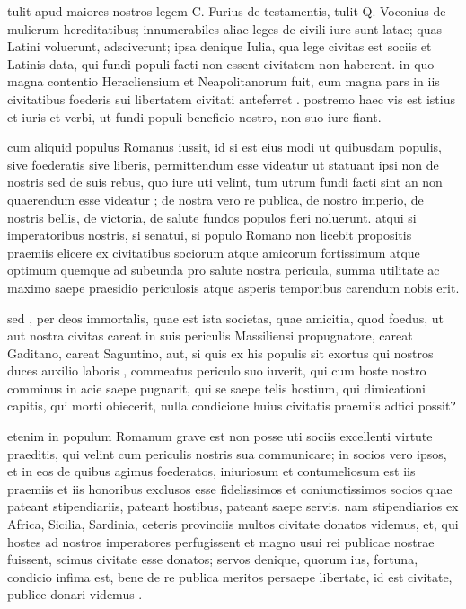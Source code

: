  tulit apud maiores nostros legem C. Furius de testamentis, tulit Q. Voconius de mulierum hereditatibus; innumerabiles aliae leges de civili iure sunt latae; quas Latini voluerunt, adsciverunt; ipsa denique Iulia, qua lege civitas est sociis et Latinis data, qui fundi populi facti non essent civitatem non haberent. in quo magna contentio Heracliensium et Neapolitanorum fuit, cum magna pars in iis civitatibus foederis sui libertatem civitati anteferret . postremo haec vis est istius et iuris et verbi, ut fundi populi beneficio nostro, non suo iure fiant.

 cum aliquid populus Romanus iussit, id si est eius modi ut quibusdam populis, sive foederatis sive liberis, permittendum esse videatur ut statuant ipsi non de nostris sed de suis rebus, quo iure uti velint, tum utrum fundi facti sint an non quaerendum esse videatur ; de nostra vero re publica, de nostro imperio, de nostris bellis, de victoria, de salute fundos populos fieri noluerunt. atqui si imperatoribus nostris, si senatui, si populo Romano non licebit propositis praemiis elicere ex civitatibus sociorum atque amicorum fortissimum atque optimum quemque ad subeunda pro salute nostra pericula, summa utilitate ac maximo saepe praesidio periculosis atque asperis temporibus carendum nobis erit.

 sed , per deos immortalis, quae est ista societas, quae amicitia, quod foedus, ut aut nostra civitas careat in suis periculis Massiliensi propugnatore, careat Gaditano, careat Saguntino, aut, si quis ex his populis sit exortus qui nostros duces auxilio laboris , commeatus periculo suo iuverit, qui cum hoste nostro comminus in acie saepe pugnarit, qui se saepe telis hostium, qui dimicationi capitis, qui morti obiecerit, nulla condicione huius civitatis praemiis adfici possit?

 etenim in populum Romanum grave est non posse uti sociis excellenti virtute praeditis, qui velint cum periculis nostris sua communicare; in socios vero ipsos, et in eos de quibus agimus foederatos, iniuriosum et contumeliosum est iis praemiis et iis honoribus exclusos esse fidelissimos et coniunctissimos socios quae pateant stipendiariis, pateant hostibus, pateant saepe servis. nam stipendiarios ex Africa, Sicilia, Sardinia, ceteris provinciis multos civitate donatos videmus, et, qui hostes ad nostros imperatores perfugissent et magno usui rei publicae nostrae fuissent, scimus civitate esse donatos; servos denique, quorum ius, fortuna, condicio infima est, bene de re publica meritos persaepe libertate, id est civitate, publice donari videmus .

